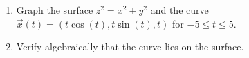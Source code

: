 \begin{problem}
\begin{enumerate}
\item Graph the surface $z^2 = x^2 +y^2$ and the curve $\vec{x}(t) = (t\cos(t), t\sin(t), t)$ for $-5\leq t\leq 5$.
\item Verify algebraically that the curve lies on the surface.
\end{enumerate}
\end{problem}